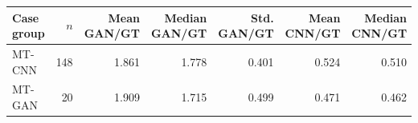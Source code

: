 \begin{tabular}{lrrrrrr}
\toprule
Case group & $n$ & Mean GAN/GT & Median GAN/GT & Std. GAN/GT & Mean CNN/GT & Median CNN/GT \\
\midrule
MT-CNN & 148 & 1.861 & 1.778 & 0.401 & 0.524 & 0.510 \\
MT-GAN & 20 & 1.909 & 1.715 & 0.499 & 0.471 & 0.462 \\
\bottomrule
\end{tabular}
